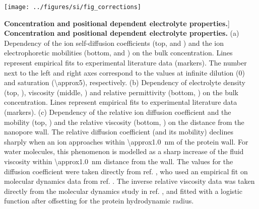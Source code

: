 
\begin{figure*}[!b]

\centering

\texttt{[image: ../figures/si/fig\_corrections]}

\caption
[\textbf{Concentration and positional dependent electrolyte properties.}]
{
\textbf{Concentration and positional dependent electrolyte properties.}
(a)
Dependency of the ion self-diffusion coefficients (top, \Na\:  and \Cl\:
) and the ion electrophoretic mobilities (bottom, \Na\:
 and \Cl\: ) on the bulk 
concentration. Lines represent empirical fits to experimental literature data (markers). The number next to
the left and right axes correspond to the values at infinite dilution (\SI{0}{\Molar}) and saturation
(\SI{\approx5}{\Molar}),  respectively.
(b)
Dependency of electrolyte density (top, ), viscosity (middle,
) and relative permittivity (bottom, ) on the
bulk  concentration. Lines represent empirical fits to experimental literature data (markers).
(c)
Dependency of the relative ion diffusion coefficient and the mobility (top, ) and
the relative viscosity (bottom, ) on the distance from the nanopore wall. The
relative diffusion coefficient (and its mobility) declines sharply when an ion approaches within
\SI{\approx1.0}{\nm} of the protein wall. For water molecules, this phenomenon is modelled as a sharp increase
of the fluid viscosity within \SI{\approx1.0}{\nm} distance from the wall. The values for the diffusion
coefficient were taken directly from ref. , who used an empirical fit on molecular
dynamics data from ref. . The inverse relative viscosity data was taken directly from
the molecular dynamics study in ref. , and fitted with a logistic function after
offsetting for the protein hydrodynamic radius.
}

\label{fig:corrections}

\end{figure*}
